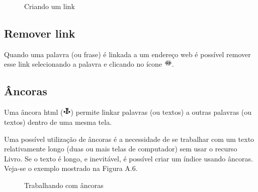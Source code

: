 \begin{figure}
 \begin{center}
  \caption{Criando um link}
 \end{center}
\end{figure}

\subsection{Remover link}


Quando uma palavra (ou frase) é linkada a um endereço web é possível remover esse link selecionando a palavra e clicando no ícone \includegraphics[width=0.4cm]{imagem/cap0/unlink.jpg}.

\subsection{Âncoras}


Uma âncora html (\includegraphics[width=0.4cm]{imagem/cap0/ed_anchor.jpg}) permite linkar palavras (ou textos) a outras palavras (ou textos) dentro de uma mesma tela.

Uma possível utilização de âncoras é a necessidade de se trabalhar com um texto relativamente longo (duas ou mais telas de computador) sem usar o recurso Livro. Se o texto é longo, e inevitável, é possível criar um índice usando âncoras. Veja-se o exemplo mostrado na Figura A.6.

\begin{figure}
 \begin{center}
  \caption{Trabalhando com âncoras}
 \end{center}
\end{figure}

